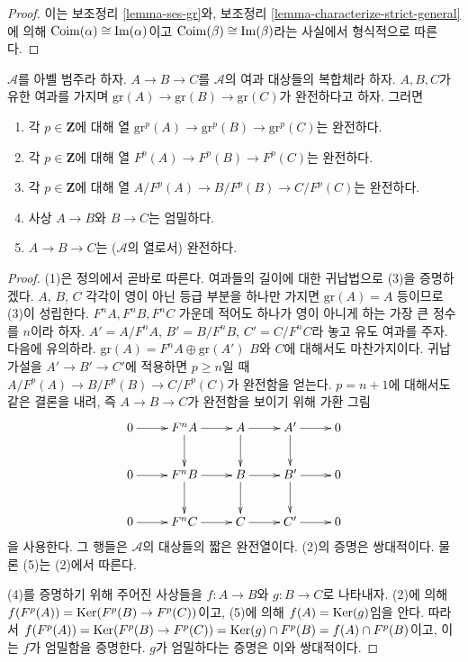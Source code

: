 \begin{proof}
이는 보조정리 \ref{lemma-ses-gr}와, 보조정리
\ref{lemma-characterize-strict-general}에 의해
$\mathop{\mathrm{Coim}}(\alpha) \cong \mathop{\mathrm{Im}}(\alpha)$이고
$\mathop{\mathrm{Coim}}(\beta) \cong \mathop{\mathrm{Im}}(\beta)$라는 사실에서 형식적으로 따른다.
\end{proof}

\begin{lemma}
\label{lemma-filtered-acyclic}
$\mathcal{A}$를 아벨 범주라 하자. $A \to B \to C$를
$\mathcal{A}$의 여과 대상들의 복합체라 하자. $A, B, C$가 유한 여과를
가지며 $\text{gr}(A) \to \text{gr}(B) \to \text{gr}(C)$가
완전하다고 하자. 그러면
\begin{enumerate}
\item 각 $p \in \mathbf{Z}$에 대해 열
$\text{gr}^p(A) \to \text{gr}^p(B) \to \text{gr}^p(C)$는 완전하다.
\item 각 $p \in \mathbf{Z}$에 대해 열
$F^p(A) \to F^p(B) \to F^p(C)$는 완전하다.
\item 각 $p \in \mathbf{Z}$에 대해 열
$A/F^p(A) \to B/F^p(B) \to C/F^p(C)$는 완전하다.
\item 사상 $A \to B$와 $B \to C$는 엄밀하다.
\item $A \to B \to C$는 ($\mathcal{A}$의 열로서) 완전하다.
\end{enumerate}
\end{lemma}

\begin{proof}
(1)은 정의에서 곧바로 따른다. 여과들의 길이에 대한 귀납법으로 (3)을
증명하겠다. $A$, $B$, $C$ 각각이 영이 아닌 등급 부분을 하나만 가지면
$\text{gr}(A) = A$ 등이므로 (3)이 성립한다. $F^nA, F^nB, F^nC$
가운데 적어도 하나가 영이 아니게 하는 가장 큰 정수를 $n$이라
하자. $A' = A/F^nA$, $B' = B/F^nB$, $C' = C/F^nC$라 놓고 유도
여과를 주자. 다음에 유의하라.
$\text{gr}(A) = F^nA \oplus \text{gr}(A')$
$B$와 $C$에 대해서도 마찬가지이다. 귀납 가설을
$A' \to B' \to C'$에 적용하면 $p \geq n$일 때
$A/F^p(A) \to B/F^p(B) \to C/F^p(C)$가 완전함을 얻는다.
$p = n + 1$에 대해서도 같은 결론을 내려, 즉 $A \to B \to C$가
완전함을 보이기 위해 가환 그림
$$
\xymatrix{
0 \ar[r] & F^nA \ar[r] \ar[d] & A \ar[r] \ar[d] & A' \ar[r] \ar[d] & 0 \\
0 \ar[r] & F^nB \ar[r] \ar[d] & B \ar[r] \ar[d] & B' \ar[r] \ar[d] & 0 \\
0 \ar[r] & F^nC \ar[r] & C \ar[r] & C' \ar[r] & 0
}
$$
을 사용한다. 그 행들은 $\mathcal{A}$의 대상들의 짧은 완전열이다.
(2)의 증명은 쌍대적이다. 물론 (5)는 (2)에서 따른다.

\medskip\noindent
(4)를 증명하기 위해 주어진 사상들을 $f : A \to B$와
$g : B \to C$로 나타내자. (2)에 의해
$f(F^p(A)) = \mathop{\mathrm{Ker}}(F^p(B) \to F^p(C))$이고, (5)에 의해
$f(A) = \mathop{\mathrm{Ker}}(g)$임을 안다. 따라서
$f(F^p(A)) =  \mathop{\mathrm{Ker}}(F^p(B) \to F^p(C)) =
\mathop{\mathrm{Ker}}(g) \cap F^p(B) = f(A) \cap F^p(B)$이고, 이는 $f$가 엄밀함을
증명한다. $g$가 엄밀하다는 증명은 이와 쌍대적이다.
\end{proof}











